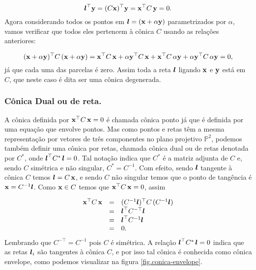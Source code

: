 \begin{equation*}
\boldsymbol{l}^\top{\bf y}=(C\mathbf{x})^\top{\bf y}=\mathbf{x}^\top C\,{\bf y}=0.
\end{equation*}  
Agora considerando todos os pontos em $\boldsymbol{l}=(\mathbf{x}+\alpha{\bf y})$ parametrizados por $\alpha$, vamos verificar que todos eles pertencem à cônica $C$ usando as relações anteriores:

\begin{equation*}
(\mathbf{x}+\alpha{\bf y})^\top C\,(\mathbf{x}+\alpha{\bf y})=\mathbf{x}^\top C\,\mathbf{x}+\alpha{\bf y}^\top C\,\mathbf{x}+\mathbf{x}^\top C\,\alpha{\bf y}+\alpha{\bf y}^\top C\,\alpha{\bf y}=0,
\end{equation*}
já que cada uma das parcelas é zero. Assim toda a reta $\boldsymbol{l}$ ligando $\mathbf{x}$ e ${\bf y}$ está em $C$, que neste caso é dita ser uma cônica degenerada.\\

\subsubsection{Cônica Dual ou de reta.} 

A cônica definida por $\mathbf{x}^\top C\,\mathbf{x}=0$ é chamada cônica ponto já que é definida por uma equação que envolve pontos. Mas como pontos e retas têm a mesma representação por vetores de três componentes no plano projetivo $\mathbb{P}^2$, podemos também definir uma cônica por retas, chamada cônica dual ou de retas denotada por $C^*$, onde $\boldsymbol{l}^\top C^*\,\boldsymbol{l}=0$. Tal notação indica que $C^*$ é a matriz adjunta de $C$ e, sendo $C$ simétrica e não singular, $C^*=C^{-1}$. Com efeito, sendo $\boldsymbol{l}$ tangente à cônica $C$ temos $\boldsymbol{l}=C\,\mathbf{x}$, e sendo $C$ não singular temos que o ponto de tangência é $\mathbf{x}=C^{-1}\boldsymbol{l}$. Como $\mathbf{x}\in C$ temos que $\mathbf{x}^\top C\,\mathbf{x}=0$, assim

\begin{equation*}
\begin{array}{rcl}
\mathbf{x}^\top C\,\mathbf{x}&=&(C^{-1}\boldsymbol{l})^\top C\,(
C^{-1}\boldsymbol{l})\\
&=&\boldsymbol{l}^\top C^{-\top}\boldsymbol{l}\\
&=&\boldsymbol{l}^\top C^{-1}\boldsymbol{l}\\
&=&0.
\end{array}
\end{equation*}
Lembrando que $C^{-\top}=C^{-1}$ pois $C$ é simétrica. A relação $\boldsymbol{l}^\top C^*\,\boldsymbol{l}=0$ indica que as retas $\boldsymbol{l}_i$ são tangentes à cônica $C$, e por isso tal cônica é conhecida como cônica envelope, como podemos visualizar na figura \ref{fig.conica-envelope}.

